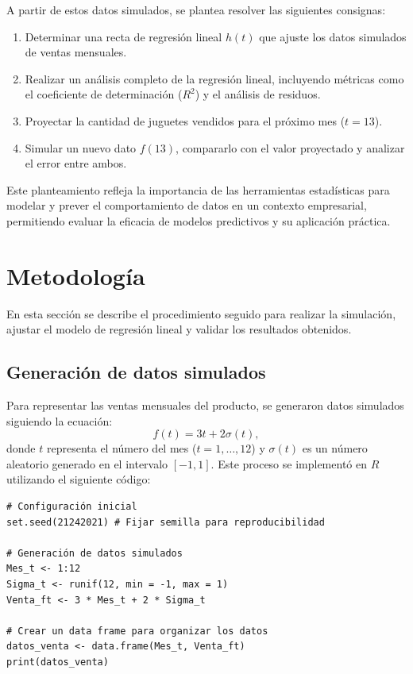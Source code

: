 \documentclass[a4paper,12pt]{article}
\begin{document}
A partir de estos datos simulados, se plantea resolver las siguientes consignas:
\begin{enumerate}
    \item Determinar una recta de regresión lineal \( h(t) \) que ajuste los datos simulados de ventas mensuales.
    \item Realizar un análisis completo de la regresión lineal, incluyendo métricas como el coeficiente de determinación (\( R^2 \)) y el análisis de residuos.
    \item Proyectar la cantidad de juguetes vendidos para el próximo mes (\( t = 13 \)).
    \item Simular un nuevo dato \( f(13) \), compararlo con el valor proyectado y analizar el error entre ambos.
\end{enumerate}

Este planteamiento refleja la importancia de las herramientas estadísticas para modelar y prever el comportamiento de datos en un contexto empresarial, permitiendo evaluar la eficacia de modelos predictivos y su aplicación práctica.


\section{Metodología}

En esta sección se describe el procedimiento seguido para realizar la simulación, ajustar el modelo de regresión lineal y validar los resultados obtenidos.

\subsection{Generación de datos simulados}

Para representar las ventas mensuales del producto, se generaron datos simulados siguiendo la ecuación:
\[
f(t) = 3t + 2\sigma(t),
\]
donde \( t \) representa el número del mes (\( t = 1, \ldots, 12 \)) y \( \sigma(t) \) es un número aleatorio generado en el intervalo \([-1,1]\). Este proceso se implementó en \( R \) utilizando el siguiente código:

\begin{verbatim}
# Configuración inicial
set.seed(21242021) # Fijar semilla para reproducibilidad

# Generación de datos simulados
Mes_t <- 1:12
Sigma_t <- runif(12, min = -1, max = 1)
Venta_ft <- 3 * Mes_t + 2 * Sigma_t

# Crear un data frame para organizar los datos
datos_venta <- data.frame(Mes_t, Venta_ft)
print(datos_venta)
\end{verbatim}
\end{document}

